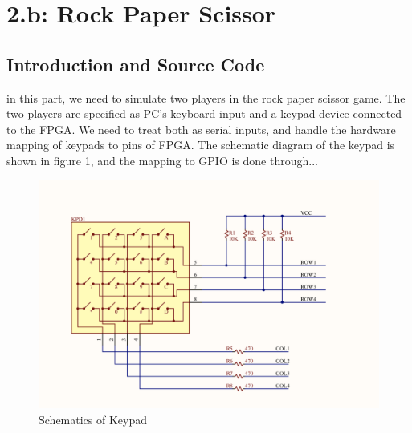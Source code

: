 \documentclass{article}
\begin{document}
\section{2.b: Rock Paper Scissor}
\subsection{Introduction and Source Code}
in this part, we need to simulate two players in the rock paper scissor game. The two players are specified as PC's keyboard input and a keypad device connected to the FPGA. We need to treat both as serial inputs, and handle the hardware mapping of keypads to pins of FPGA. The schematic diagram of the keypad is shown in figure 1, and the mapping to GPIO is done through...

\begin{figure}[h]
  \centering
  \includegraphics[width=\linewidth]{schematics.png}
  \caption{Schematics of Keypad}
  \label{fig:schematics}
\end{figure}
\end{document}

